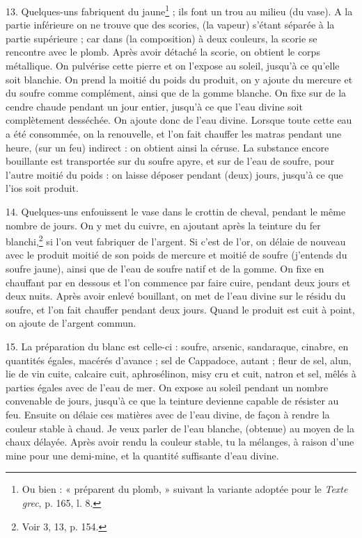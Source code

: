 \documentclass[a4paper, 11pt, oneside, polutonikogreek, french]{article}
\begin{document}
13. Quelques-uns fabriquent du jaune\footnote{Ou bien : « préparent du plomb, » suivant la variante adoptée pour le \emph{Texte grec}, p. 165, l. 8.} ; ils font un trou au milieu (du vase). A la partie inférieure on ne trouve que des scories, (la vapeur) s'étant séparée à la partie supérieure ; car dans (la composition) à deux couleurs, la scorie se rencontre avec le plomb. Après avoir détaché la scorie, on obtient le corps métallique. On pulvérise cette pierre et on l'expose au soleil, jusqu'à ce qu'elle soit blanchie. On prend la moitié du poids du produit, on y ajoute du mercure et du soufre comme complément, ainsi que de la gomme blanche. On fixe sur de la cendre chaude pendant un jour entier, jusqu'à ce que l'eau divine soit complètement desséchée. On ajoute donc de l'eau divine. Lorsque toute cette eau a été consommée, on la renouvelle, et l'on fait chauffer les matras pendant une heure, (sur un feu) indirect : on obtient ainsi la céruse. La substance encore bouillante est transportée sur du soufre apyre, et sur de l'eau de soufre, pour l'autre moitié du poids : on laisse déposer pendant (deux) jours, jusqu'à ce que l'ios soit produit.

14. Quelques-uns enfouissent le vase dans le crottin de cheval, pendant le même nombre de jours. On y met du cuivre, en ajoutant après la teinture du fer blanchi,\footnote{Voir 3, 13, p. 154.} si l'on veut fabriquer de l'argent. Si c'est de l'or, on délaie de nouveau avec le produit moitié de son poids de mercure et moitié de soufre (j'entends du soufre jaune), ainsi que de l'eau de soufre natif et de la gomme. On fixe en chauffant par en dessous et l'on commence par faire cuire, pendant deux jours et deux nuits. Après avoir enlevé bouillant, on met de l'eau divine sur le résidu du soufre, et l'on fait chauffer pendant deux jours. Quand le produit est cuit à point, on ajoute de l'argent commun.

15. La préparation du blanc est celle-ci : soufre, arsenic, sandaraque, cinabre, en quantités égales, macérés d'avance ; sel de Cappadoce, autant ; fleur de sel, alun, lie de vin cuite, calcaire cuit, aphrosélinon, misy cru et cuit, natron et sel, mêlés à parties égales avec de l'eau de mer. On expose au soleil pendant un nombre convenable de jours, jusqu'à ce que la teinture devienne capable de résister au feu. Ensuite on délaie ces matières avec de l'eau divine, de façon à rendre la couleur stable à chaud. Je veux parler de l'eau blanche, (obtenue) au moyen de la chaux délayée. Après avoir rendu la couleur stable, tu la mélanges, à raison d'une mine pour une demi-mine, et la quantité suffisante d'eau divine.
\end{document}
